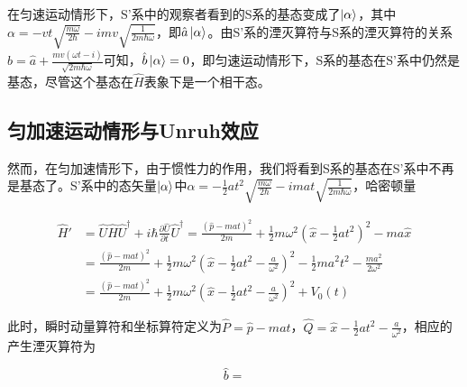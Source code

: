 \documentclass[a4paper]{article}
\begin{document}
            在匀速运动情形下，S'系中的观察者看到的S系的基态变成了$\ket{\alpha}$，其中$\alpha=-vt\sqrt{\frac{m\omega}{2\hbar}}-imv\sqrt{\frac{1}{2m\hbar\omega}}$，即$\hat{a}\ket{\alpha}$。由S'系的湮灭算符与S系的湮灭算符的关系$\hat{b}=\hat{a}+\frac{mv(\omega t-i)}{\sqrt{2m\hbar\omega}}$可知，$\hat{b}\ket{\alpha}=0$，即匀速运动情形下，S系的基态在S'系中仍然是基态，尽管这个基态在$\hat{H}$表象下是一个相干态。


        \subsection{匀加速运动情形与Unruh效应}

            然而，在匀加速情形下，由于惯性力的作用，我们将看到S系的基态在S'系中不再是基态了。S'系中的态矢量$\ket{\alpha}$中$\alpha=-\frac{1}{2}at^2\sqrt{\frac{m\omega}{2\hbar}}-imat\sqrt{\frac{1}{2m\hbar\omega}}$，哈密顿量
            
            \begin{equation}
                \begin{split}
                    \hat{H}' &= \hat{U}\hat{H}\hat{U}^\dagger+i\hbar\frac{\partial\hat{U}}{\partial t}\hat{U}^\dagger = \frac{(\hat{p}-mat)^2}{2m}+\frac{1}{2}m\omega^2(\hat{x}-\frac{1}{2}at^2)^2-ma\hat{x} \\
                        &= \frac{(\hat{p}-mat)^2}{2m}+\frac{1}{2}m\omega^2(\hat{x}-\frac{1}{2}at^2-\frac{a}{\omega^2})^2-\frac{1}{2}ma^2t^2-\frac{ma^2}{2\omega^2}　\\
                        &= \frac{(\hat{p}-mat)^2}{2m}+\frac{1}{2}m\omega^2(\hat{x}-\frac{1}{2}at^2-\frac{a}{\omega^2})^2+V_0(t)
                \end{split}
            \end{equation}
                
            此时，瞬时动量算符和坐标算符定义为$\hat{P}=\hat{p}-mat$，$\hat{Q}=\hat{x}-\frac{1}{2}at^2-\frac{a}{\omega^2}$，相应的产生湮灭算符为

            \begin{equation}
                \hat{b}=
            \end{equation}
\end{document}
